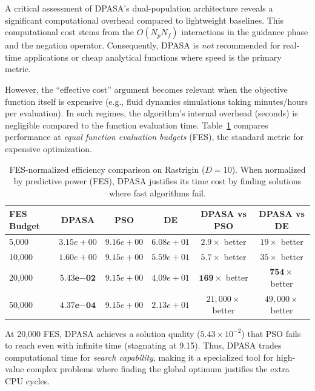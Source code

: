 \documentclass[11pt]{article}
\begin{document}
A critical assessment of DPASA's dual-population architecture reveals a significant computational overhead compared to lightweight baselines. This computational cost stems from the $O(N_p N_f)$ interactions in the guidance phase and the negation operator. Consequently, DPASA is \textit{not} recommended for real-time applications or cheap analytical functions where speed is the primary metric.

However, the ``effective cost'' argument becomes relevant when the objective function itself is expensive (e.g., fluid dynamics simulations taking minutes/hours per evaluation). In such regimes, the algorithm's internal overhead (seconds) is negligible compared to the function evaluation time. Table~\ref{tab:fes_efficiency} compares performance at \textit{equal function evaluation budgets} (FES), the standard metric for expensive optimization.

\begin{table}[ht]
\centering
\caption{FES-normalized efficiency comparison on Rastrigin ($D=10$). When normalized by predictive power (FES), DPASA justifies its time cost by finding solutions where fast algorithms fail.}
\label{tab:fes_efficiency}
\small
\begin{tabular}{@{}lccccc@{}}
\toprule
\textbf{FES Budget} & \textbf{DPASA} & \textbf{PSO} & \textbf{DE} & \textbf{DPASA vs PSO} & \textbf{DPASA vs DE} \\
\midrule
5,000 & $3.15e+00$ & $9.16e+00$ & $6.08e+01$ & $2.9\times$ better & $19\times$ better \\
10,000 & $1.60e+00$ & $9.15e+00$ & $5.59e+01$ & $5.7\times$ better & $35\times$ better \\
20,000 & $\mathbf{5.43e{-02}}$ & $9.15e+00$ & $4.09e+01$ & $\mathbf{169\times}$ better & $\mathbf{754\times}$ better \\
50,000 & $\mathbf{4.37e{-04}}$ & $9.15e+00$ & $2.13e+01$ & $21,\!000\times$ better & $49,\!000\times$ better \\
\bottomrule
\end{tabular}
\end{table}

At 20,000 FES, DPASA achieves a solution quality ($5.43 \times 10^{-2}$) that PSO fails to reach even with infinite time (stagnating at 9.15). Thus, DPASA trades computational time for \textit{search capability}, making it a specialized tool for high-value complex problems where finding the global optimum justifies the extra CPU cycles.
\end{document}
